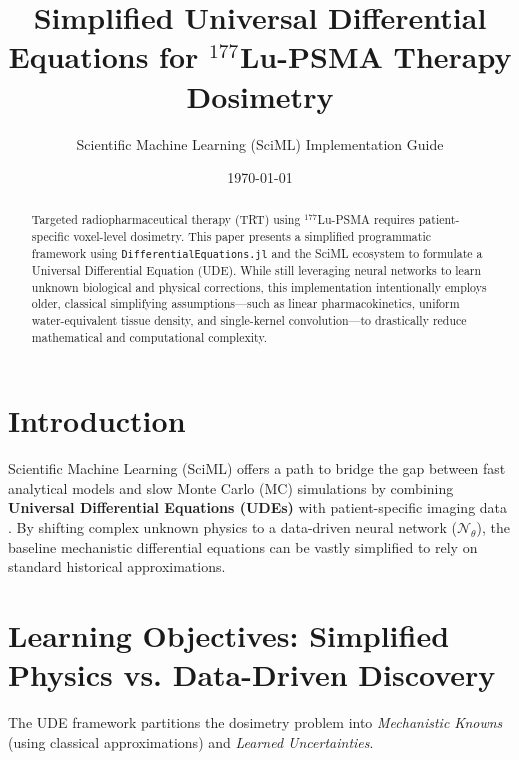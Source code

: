 \documentclass[11pt,a4paper]{article}
\title{\textbf{Simplified Universal Differential Equations for $^{177}$Lu-PSMA Therapy Dosimetry}}
\author{Scientific Machine Learning (SciML) Implementation Guide}
\date{\today}
\begin{document}
\maketitle

\begin{abstract}
Targeted radiopharmaceutical therapy (TRT) using $^{177}$Lu-PSMA requires patient-specific voxel-level dosimetry. This paper presents a simplified programmatic framework using \texttt{DifferentialEquations.jl} and the SciML ecosystem to formulate a Universal Differential Equation (UDE). While still leveraging neural networks to learn unknown biological and physical corrections, this implementation intentionally employs older, classical simplifying assumptions—such as linear pharmacokinetics, uniform water-equivalent tissue density, and single-kernel convolution—to drastically reduce mathematical and computational complexity.
\end{abstract}

\section{Introduction}
Scientific Machine Learning (SciML) offers a path to bridge the gap between fast analytical models and slow Monte Carlo (MC) simulations by combining \textbf{Universal Differential Equations (UDEs)} with patient-specific imaging data \cite{KennedyLugassi2020}. By shifting complex unknown physics to a data-driven neural network ($\mathcal{N}_\theta$), the baseline mechanistic differential equations can be vastly simplified to rely on standard historical approximations.

\section{Learning Objectives: Simplified Physics vs. Data-Driven Discovery}

The UDE framework partitions the dosimetry problem into \textit{Mechanistic Knowns} (using classical approximations) and \textit{Learned Uncertainties}.
\end{document}
